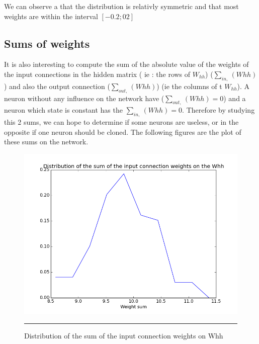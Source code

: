 We can observe a that the distribution is relativly symmetric and that most weights are within the interval $[-0.2;02] $

\subsection{Sums of weights}

It is also interesting to compute the sum of the absolute value of the weights of the input connections in the hidden matrix ( ie : the rows of $W_{hh}$) ($\sum_{in,}(Whh)$) and also the output connection ($\sum_{out,}(Whh)$) (ie the columns of t $W_{hh} $). A neuron without any influence on the network have ($\sum_{out,}(Whh) = 0$) and a neuron which state is constant has the $\sum_{in,}(Whh) = 0$. Therefore by studying this 2 sums, we can hope to determine if some neurons are useless, or in the opposite if one neuron should be cloned.
The following figures are the plot of these sums on the network. 

\begin{figure}[htbp]
    \centering
    \includegraphics[scale=0.4]{Figures/input_sum_weight_distribution.png}
    \rule{35em}{0.5pt}
    \caption[Distribution of the sum of the input connection weights on Whh]{Distribution of the sum of the input connection weights on Whh}
    \label{fig:input_sum}
\end{figure}


